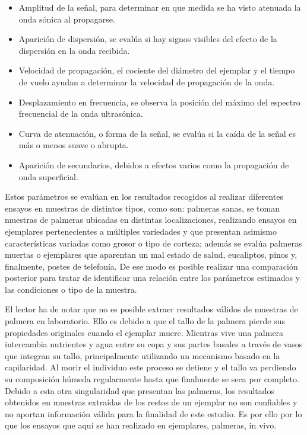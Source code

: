 \begin{itemize}
    \item Amplitud de la señal, para determinar en que medida se ha visto
	atenuada la onda sónica al propagarse.
    \item Aparición de dispersión, se evalúa si hay signos visibles del
	efecto de la dispersión en la onda recibida.
    \item Velocidad de propagación, el cociente del diámetro del ejemplar y
	el tiempo de vuelo ayudan a determinar la velocidad de propagación
	de la onda.
    \item Desplazamiento en frecuencia, se observa la posición del máximo
	del espectro frecuencial de la onda ultrasónica.
    \item Curva de atenuación, o forma de la señal, se evalúa si la caída
	de la señal es más o menos suave o abrupta.
    \item Aparición de secundarios, debidos a efectos varios como la
	propagación de onda superficial.
\end{itemize}

Estos parámetros se evalúan en los resultados recogidos al realizar
diferentes ensayos en muestras de distintos tipos, como son: palmeras
sanas, se toman muestras de palmeras ubicadas en distintas localizaciones,
realizando ensayos en ejemplares pertenecientes a múltiples variedades y
que presentan asimismo características variadas como grosor o tipo de
corteza; además se evalúa palmeras muertas o ejemplares que aparentan un
mal estado de salud, eucaliptos, pinos y, finalmente, postes de telefonía.
De ese modo es posible realizar una comparación posterior para tratar de
identificar una relación entre los parámetros estimados y las condiciones o
tipo de la muestra.

El lector ha de notar que no es posible extraer resultados válidos de
muestras de palmera en laboratorio. Ello es debido a que el tallo de la
palmera pierde sus propiedades originales cuando el ejemplar muere.
Mientras vive una palmera intercambia nutrientes y agua entre su copa y sus
partes basales a través de vasos que integran su tallo, principalmente
utilizando un mecanismo basado en la capilaridad. Al morir el individuo
este proceso se detiene y el tallo va perdiendo su composición húmeda
regularmente hasta que finalmente se seca por completo. Debido a esta otra
singularidad que presentan las palmeras, los resultados obtenidos en
muestras extraídas de los restos de un ejemplar no son confiables y no
aportan información válida para la finalidad de este estudio. Es por ello
por lo que los ensayos que aquí se han realizado en ejemplares, palmeras,
in vivo.

